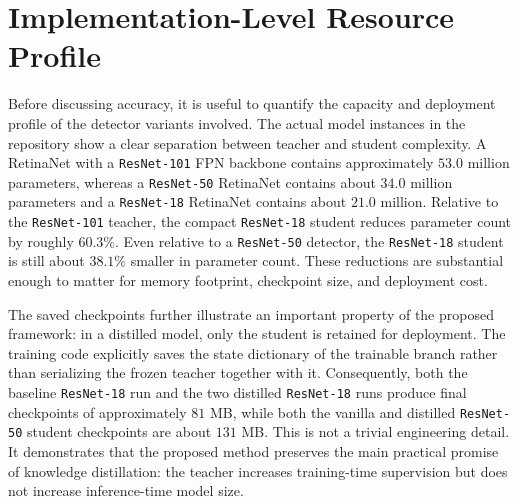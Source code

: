 \section{Implementation-Level Resource Profile}

Before discussing accuracy, it is useful to quantify the capacity and deployment profile of the detector variants involved. The actual model instances in the repository show a clear separation between teacher and student complexity. A RetinaNet with a \texttt{ResNet-101} FPN backbone contains approximately $53.0$ million parameters, whereas a \texttt{ResNet-50} RetinaNet contains about $34.0$ million parameters and a \texttt{ResNet-18} RetinaNet contains about $21.0$ million. Relative to the \texttt{ResNet-101} teacher, the compact \texttt{ResNet-18} student reduces parameter count by roughly $60.3\%$. Even relative to a \texttt{ResNet-50} detector, the \texttt{ResNet-18} student is still about $38.1\%$ smaller in parameter count. These reductions are substantial enough to matter for memory footprint, checkpoint size, and deployment cost.

The saved checkpoints further illustrate an important property of the proposed framework: in a distilled model, only the student is retained for deployment. The training code explicitly saves the state dictionary of the trainable branch rather than serializing the frozen teacher together with it. Consequently, both the baseline \texttt{ResNet-18} run and the two distilled \texttt{ResNet-18} runs produce final checkpoints of approximately $81$ MB, while both the vanilla and distilled \texttt{ResNet-50} student checkpoints are about $131$ MB. This is not a trivial engineering detail. It demonstrates that the proposed method preserves the main practical promise of knowledge distillation: the teacher increases training-time supervision but does not increase inference-time model size.

\begin{table}[t]
\centering
\small
{}
\caption{Approximate detector sizes measured from the implemented models and saved checkpoints in the repository. In distilled training, the deployed model remains the student only, so teacher capacity does not increase inference-time storage.}
\label{tab:model-size}
\end{table}

